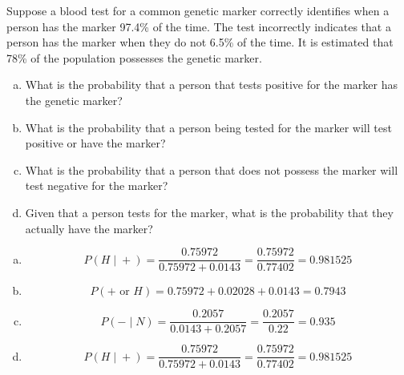 \documentclass[11pt,letterpaper]{article}
\begin{document}
\newpage



 Suppose a blood test for a common genetic marker correctly identifies when a person has the marker 97.4\% of the time. The test incorrectly indicates that a person has the marker when they do not 6.5\% of the time. It is estimated that 78\% of the population possesses the genetic marker. 
	\begin{enumerate}[(a)]
	\item What is the probability that a person that tests positive for the marker has the genetic marker?
	\item What is the probability that a person being tested for the marker will test positive or have the marker? 
	\item What is the probability that a person that does not possess the marker will test negative for the marker?
	\item Given that a person tests for the marker, what is the probability that they actually have the marker? 
	\end{enumerate} \pspace

\sol
\begin{enumerate}[(a)]
\item 
	\[
	P(H \;|\; +)= \dfrac{0.75972}{0.75972 + 0.0143}= \dfrac{0.75972}{0.77402}= 0.981525
	\] \pspace

\item 
	\[
	P(+ \text{ or } H)= 0.75972 + 0.02028 + 0.0143= 0.7943
	\] \pspace

\item 
	\[
	P(- \;|\; N)= \dfrac{0.2057}{0.0143 + 0.2057}= \dfrac{0.2057}{0.22}= 0.935
	\] \pspace

\item 
	\[
	P(H \;|\; +)= \dfrac{0.75972}{0.75972 + 0.0143}= \dfrac{0.75972}{0.77402}= 0.981525
	\]
\end{enumerate} \pspace
\end{document}
